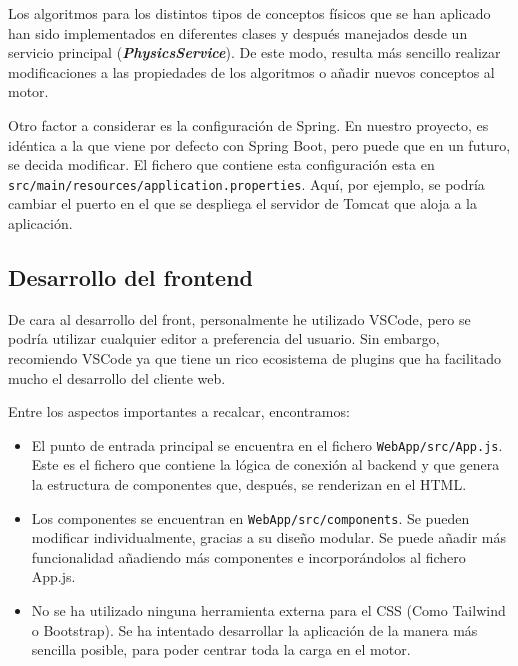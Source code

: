 
Los algoritmos para los distintos tipos de conceptos físicos que se han aplicado han sido implementados en diferentes clases y después manejados desde un servicio principal (\textbf{\textit{PhysicsService}}). De este modo, resulta más sencillo realizar modificaciones a las propiedades de los algoritmos o añadir nuevos conceptos al motor. 

Otro factor a considerar es la configuración de Spring. En nuestro proyecto, es idéntica a la que viene por defecto con Spring Boot, pero puede que en un futuro, se decida modificar. El fichero que contiene esta configuración esta en \texttt{src/main/resources/application.properties}. Aquí, por ejemplo, se podría cambiar el puerto en el que se despliega el servidor de Tomcat que aloja a la aplicación.
\subsection{Desarrollo del frontend}
De cara al desarrollo del front, personalmente he utilizado VSCode, pero se podría utilizar cualquier editor a preferencia del usuario. Sin embargo, recomiendo VSCode ya que tiene un rico ecosistema de plugins que ha facilitado mucho el desarrollo del cliente web. 

Entre los aspectos importantes a recalcar, encontramos:
\begin{itemize}
    \item El punto de entrada principal se encuentra en el fichero \texttt{WebApp/src/App.js}. Este es el fichero que contiene la lógica de conexión al backend y que genera la estructura de componentes que, después, se renderizan en el HTML.
    \item Los componentes se encuentran en \texttt{WebApp/src/components}. Se pueden modificar individualmente, gracias a su diseño modular. Se puede añadir más funcionalidad añadiendo más componentes e incorporándolos al fichero App.js.
    \item No se ha utilizado ninguna herramienta externa para el CSS (Como Tailwind o Bootstrap). Se ha intentado desarrollar la aplicación de la manera más sencilla posible, para poder centrar toda la carga en el motor.
\end{itemize}

